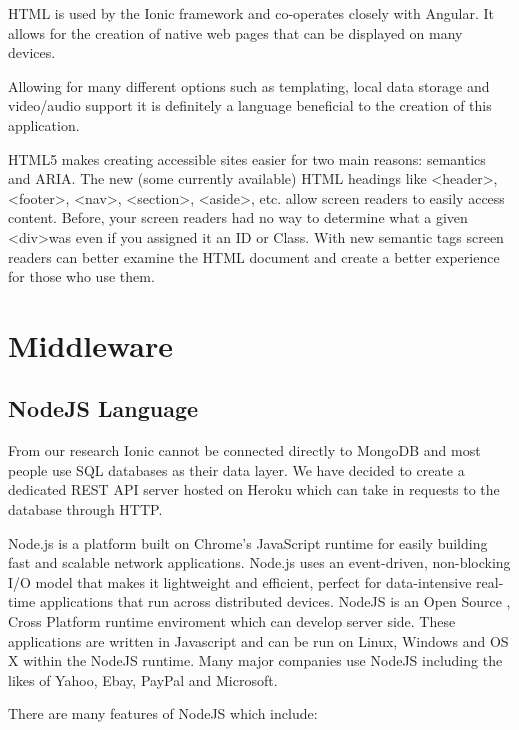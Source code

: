 HTML is used by the Ionic framework and co-operates closely with Angular. It allows for the creation of native web pages that can be displayed on many devices.

Allowing for many different options such as templating, local data storage and video/audio support it is definitely a language beneficial to the creation of this application.

HTML5 makes creating accessible sites easier for two main reasons: semantics and ARIA. The new (some currently available) HTML headings like  \textless header\textgreater, \textless footer\textgreater, \textless nav\textgreater, \textless section\textgreater, \textless aside\textgreater, etc. allow screen readers to easily access content.\cite{html} Before, your screen readers had no way to determine what a given \textless div\textgreater  was even if you assigned it an ID or Class.\cite{html} With new semantic tags screen readers can better examine the HTML document and create a better experience for those who use them.\cite{html}



\section{Middleware}
\subsection{NodeJS Language}
From our research Ionic cannot be connected directly to MongoDB and most people use SQL databases as their data layer. We have decided to create a dedicated REST API server hosted on Heroku which can take in requests to the database through HTTP.

Node.js is a platform built on Chrome's JavaScript runtime for easily building fast and scalable network applications.\cite{node} Node.js uses an event-driven, non-blocking I/O model that makes it lightweight and efficient, perfect for data-intensive real-time applications that run across distributed devices. \cite{node} NodeJS is an Open Source , Cross Platform runtime enviroment which can develop server side. These applications are written in Javascript and can be run on Linux, Windows and OS X within the NodeJS runtime. Many major companies use NodeJS including the likes of Yahoo, Ebay, PayPal and Microsoft.

There are many features of NodeJS which include:

